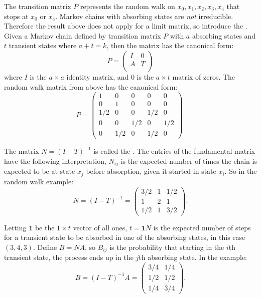 \documentclass[12pt]{article}
\begin{document}
The transition matrix \( P \) represents the random walk on \( {x_0,x_1,x_2,x_3,x_4}
\) that stops at \( x_0 \) or \( x_4 \).  Markov chains with absorbing
states are \emph{not} irreducible.  Therefore the result above does not
apply for a limit matrix, so introduce the .%
Given a Markov chain defined by transition matrix \( P \) with \( a \)
absorbing states and \( t \) transient states where \( a + t = k \),
then the matrix has the canonical form:
\[
    P=
    \begin{pmatrix}
        I & 0 \\
        A & T \\
    \end{pmatrix}
\] where \( I \) is the \( a\times a \) identity matrix, and \( 0 \) is
the \( a\times t \) matrix of zeros.  The random walk matrix from above
has the canonical form:
\[
    P =
    \begin{pmatrix}
        1 & 0 & 0 & 0 & 0 \\
        0 & 1 & 0 & 0 & 0\\
        1/2 & 0 & 0 & 1/2 & 0 \\
        0 & 0 & 1/2 & 0 & 1/2 \\
        0 & 1/2 & 0 & 1/2 & 0
    \end{pmatrix}
    .
\]

The matrix \( N=(I-T)^{-1} \) is called the .%
The entries of the fundamental matrix have the following interpretation,
\( N_{ij} \) is the expected number of times the chain is expected to be
at state \( x_j \) before absorption, given it started in state \( x_i \).
So in the random walk example:
\[
    N = (I-T)^{-1} =
    \begin{pmatrix}
        3/2 & 1 & 1/2 \\
        1 & 2 & 1\\
        1/2 & 1 & 3/2
    \end{pmatrix}
    .
\]

Letting \( \mathbf{1} \) be the \( 1 \times t \) vector of all ones, \( t= \mathbf {1} N\)
is the expected number of steps for a transient state to be absorbed in one of the
absorbing states, in this case \( (3,4,3) \). Define \( B=NA \), so \( B_{ij} \) is the probability
that starting in the \( i \)th transient state, the process ends up
in the \( j \)th absorbing state.  In the example:
\[
    B = (I-T)^{-1}A =
    \begin{pmatrix}
        3/4 & 1/4 \\
        1/2 & 1/2 \\
        1/4 & 3/4
    \end{pmatrix}
    .
\]
\end{document}
